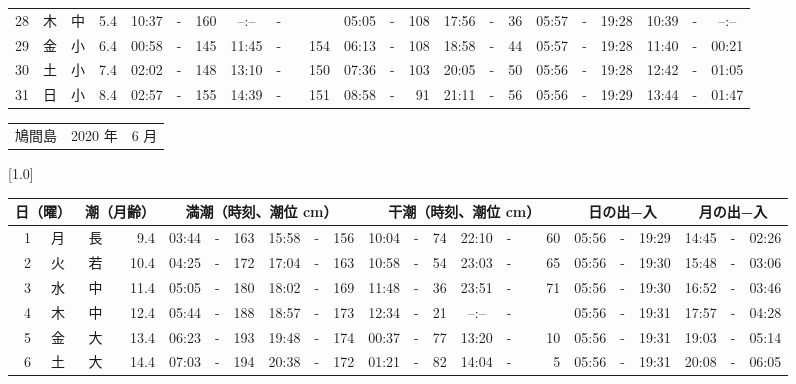 \documentclass[12pt,a4j]{jsarticle}
\begin{document}
\begin{table}[htbp]
\begin{center}
{\begin{tabular}{|rc|cr|ccrccr|ccrccr|ccc|ccc|}
28 & 木 & 中 &  5.4 &  10:37 &-& 160 &  --:-- &-&~~~~~ &  05:05 &-& 108 &  17:56 &-&  36 & 05:57 & -& 19:28 & 10:39 & -& --:-- \\
29 & 金 & 小 &  6.4 &  00:58 &-& 145 &  11:45 &-& 154 &  06:13 &-& 108 &  18:58 &-&  44 & 05:57 & -& 19:28 & 11:40 & -& 00:21 \\
30 & 土 & 小 &  7.4 &  02:02 &-& 148 &  13:10 &-& 150 &  07:36 &-& 103 &  20:05 &-&  50 & 05:56 & -& 19:28 & 12:42 & -& 01:05 \\
31 & 日 & 小 &  8.4 &  02:57 &-& 155 &  14:39 &-& 151 &  08:58 &-&  91 &  21:11 &-&  56 & 05:56 & -& 19:29 & 13:44 & -& 01:47 \\
   \hline
   \end{tabular}}
   \end{center}
\end{table}
\newpage
 \begin{table}[htbp]
 \begin{center}
 \begin{tabular}{lcc}
 \LARGE{鳩間島}  & \large{2020 年} & \large{ 6 月} \\
 \end{tabular}
 \end{center}
 \begin{center}
    \scalebox{0.7}[1.0]{
    \begin{tabular}{|rc|cr|ccrccr|ccrccr|ccc|ccc|}
    \hline
    \multicolumn{2}{|c|}{日（曜）} & \multicolumn{2}{c|}{潮（月齢）} & \multicolumn{6}{c|}{満潮（時刻、潮位 cm）} & \multicolumn{6}{c|}{干潮（時刻、潮位 cm）} & \multicolumn{3}{c|}{日の出−入} &  \multicolumn{3}{c|}{月の出−入}\\
 \hline
 1 & 月 & 長 &  9.4 &  03:44 &-& 163 &  15:58 &-& 156 &  10:04 &-&  74 &  22:10 &-&  60 & 05:56 & -& 19:29 & 14:45 & -& 02:26 \\
 2 & 火 & 若 & 10.4 &  04:25 &-& 172 &  17:04 &-& 163 &  10:58 &-&  54 &  23:03 &-&  65 & 05:56 & -& 19:30 & 15:48 & -& 03:06 \\
 3 & 水 & 中 & 11.4 &  05:05 &-& 180 &  18:02 &-& 169 &  11:48 &-&  36 &  23:51 &-&  71 & 05:56 & -& 19:30 & 16:52 & -& 03:46 \\
 4 & 木 & 中 & 12.4 &  05:44 &-& 188 &  18:57 &-& 173 &  12:34 &-&  21 &  --:-- &-&~~~~~ & 05:56 & -& 19:31 & 17:57 & -& 04:28 \\
 5 & 金 & 大 & 13.4 &  06:23 &-& 193 &  19:48 &-& 174 &  00:37 &-&  77 &  13:20 &-&  10 & 05:56 & -& 19:31 & 19:03 & -& 05:14 \\
 6 & 土 & 大 & 14.4 &  07:03 &-& 194 &  20:38 &-& 172 &  01:21 &-&  82 &  14:04 &-&   5 & 05:56 & -& 19:31 & 20:08 & -& 06:05 \\

\end{tabular}}
\end{center}
\end{table}
\end{document}
